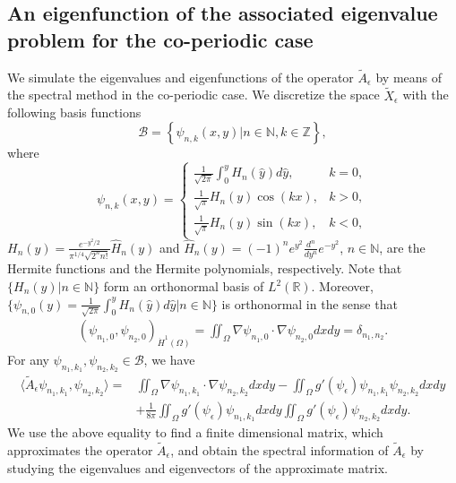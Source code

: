 \documentclass[1 [leqno, 11pt]{amsart}
\numberwithin{equation}{section}
\let\ep=\epsilon
\begin{document}
\begin{CJK*}{GBK}{song}
 \subsection{An eigenfunction of the associated eigenvalue problem for the co-periodic case}\label{eigenfunction-motivation}
We simulate the eigenvalues and eigenfunctions of the operator $\tilde{A}_\ep$  by means of the spectral method in the co-periodic case.
We discretize the space $\tilde{X}_\ep$ with the following basis functions
 $$ \mathcal{B} =\left\{\psi_{n,k}(x,y) | n \in \mathbb{N}, k \in \mathbb{Z}\right\},$$
where
$$\psi_{n,k}(x,y) = \left\{ \begin{array}{cc} \frac{1}{\sqrt{2\pi}} \int_0^y H_n(\hat{y})d\hat{y}, & k = 0,  \\ \frac{1}{\sqrt{\pi}} H_n(y)\cos(kx), & k > 0, \\
\frac{1}{\sqrt{\pi}} H_n(y)\sin(kx), & k < 0,\end{array} \right.$$
$
H_n(y)= \frac{e^{-y^2/2}}{\pi^{1/4}\sqrt{2^nn!}}\hat{H}_n(y)$ and $\hat{H}_n(y)=(-1)^ne^{y^2}\frac{d^n}{dy^n}e^{-y^2}$, $n \in \mathbb{N}$,
are the Hermite functions and the Hermite polynomials, respectively.
Note that $\{H_n(y)|n \in \mathbb{N}\}$  form an orthonormal basis of $L^2(\mathbb{R})$. Moreover,
 $\{ \psi_{n,0}(y) = \frac{1}{\sqrt{2\pi}} \int_0^y H_n(\hat{y}) d\hat{y}| n\in \mathbb{N} \}$ is orthonormal in the sense that
\begin{align}\label{psi-nk-orthonormal}
(\psi_{n_1,0}, \psi_{n_2,0})_{\dot{H}^1(\Omega)} = \iint_{\Omega} \nabla \psi_{n_1,0} \cdot \nabla \psi_{n_2,0} dxdy = \delta_{n_1, n_2}.
\end{align}
 For any $\psi_{n_1, k_1},  \psi_{n_2, k_2} \in \mathcal{B}$, we have
 \begin{align*}
 \langle\tilde{A}_\ep \psi_{n_1, k_1}, \psi_{n_2, k_2}\rangle
 =& \iint_\Omega \nabla \psi_{n_1, k_1} \cdot {\nabla \psi_{n_2, k_2}} dxdy - \iint_\Omega g'(\psi_\ep)\psi_{n_1, k_1} {\psi_{n_2, k_2}} dxdy \\
 &  + \frac{1}{8\pi} \iint_\Omega g'(\psi_\ep)\psi_{n_1, k_1} dxdy \iint_\Omega g'(\psi_\ep)\psi_{n_2, k_2} dxdy.
 \end{align*}
 We  use the above  equality to find a finite dimensional matrix, which approximates the operator $\tilde{A}_\ep$, and obtain the spectral information of $\tilde{A}_\ep$ by studying the eigenvalues and eigenvectors of the approximate matrix.



\end{CJK*}
\end{document}
